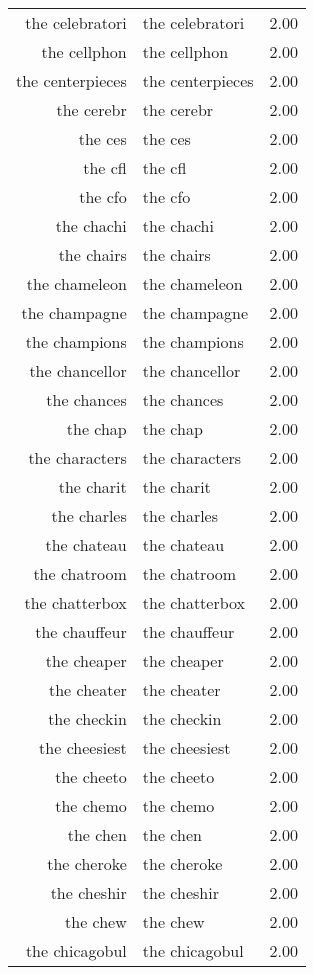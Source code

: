 \begin{table}[ht]
\begin{tabular}{rlr}
  the celebratori & the celebratori & 2.00 \\ 
  the cellphon & the cellphon & 2.00 \\ 
  the centerpieces & the centerpieces & 2.00 \\ 
  the cerebr & the cerebr & 2.00 \\ 
  the ces & the ces & 2.00 \\ 
  the cfl & the cfl & 2.00 \\ 
  the cfo & the cfo & 2.00 \\ 
  the chachi & the chachi & 2.00 \\ 
  the chairs & the chairs & 2.00 \\ 
  the chameleon & the chameleon & 2.00 \\ 
  the champagne & the champagne & 2.00 \\ 
  the champions & the champions & 2.00 \\ 
  the chancellor & the chancellor & 2.00 \\ 
  the chances & the chances & 2.00 \\ 
  the chap & the chap & 2.00 \\ 
  the characters & the characters & 2.00 \\ 
  the charit & the charit & 2.00 \\ 
  the charles & the charles & 2.00 \\ 
  the chateau & the chateau & 2.00 \\ 
  the chatroom & the chatroom & 2.00 \\ 
  the chatterbox & the chatterbox & 2.00 \\ 
  the chauffeur & the chauffeur & 2.00 \\ 
  the cheaper & the cheaper & 2.00 \\ 
  the cheater & the cheater & 2.00 \\ 
  the checkin & the checkin & 2.00 \\ 
  the cheesiest & the cheesiest & 2.00 \\ 
  the cheeto & the cheeto & 2.00 \\ 
  the chemo & the chemo & 2.00 \\ 
  the chen & the chen & 2.00 \\ 
  the cheroke & the cheroke & 2.00 \\ 
  the cheshir & the cheshir & 2.00 \\ 
  the chew & the chew & 2.00 \\ 
  the chicagobul & the chicagobul & 2.00 \\ 

\end{tabular}
\end{table}
